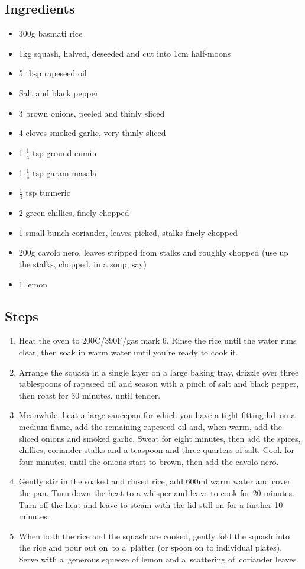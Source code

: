 \documentclass{book}
\begin{document}
\subsection*{Ingredients}
\begin{itemize}
\item 300g basmati rice
\item 1kg squash, halved, deseeded and cut into 1cm half-moons
\item 5 tbsp rapeseed oil
\item Salt and black pepper
\item 3 brown onions, peeled and thinly sliced 
\item 4 cloves smoked garlic, very thinly sliced
\item 1 $\frac{1}{4}$ tsp ground cumin
\item 1 $\frac{1}{4}$ tsp garam masala
\item $\frac{1}{4}$ tsp turmeric
\item 2 green chillies, finely chopped
\item 1 small bunch coriander, leaves picked, stalks finely chopped
\item 200g cavolo nero, leaves stripped from stalks and roughly chopped (use up the stalks, chopped, in a soup, say)
\item 1 lemon
\end{itemize}

\subsection*{Steps}
\begin{enumerate}
\item Heat the oven to 200C/390F/gas mark 6. Rinse the rice until the water runs clear, then soak in warm water until you’re ready to cook it.
\item Arrange the squash in a single layer on a large baking tray, drizzle over three tablespoons of rapeseed oil and season with a pinch of salt and black pepper, then roast for 30 minutes, until tender.
\item Meanwhile, heat a large saucepan for which you have a tight-fitting lid on a medium flame, add the remaining rapeseed oil and, when warm, add the sliced onions and smoked garlic. Sweat for eight minutes, then add the spices, chillies, coriander stalks and a teaspoon and three-quarters of salt. Cook for four minutes, until the onions start to brown, then add the cavolo nero.
\item Gently stir in the soaked and rinsed rice, add 600ml warm water and cover the pan. Turn down the heat to a whisper and leave to cook for 20 minutes. Turn off the heat and leave to steam with the lid still on for a further 10 minutes.
\item When both the rice and the squash are cooked, gently fold the squash into the rice and pour out on to a platter (or spoon on to individual plates). Serve with a generous squeeze of lemon and a scattering of coriander leaves.
\end{enumerate}
\newpage
\end{document}
